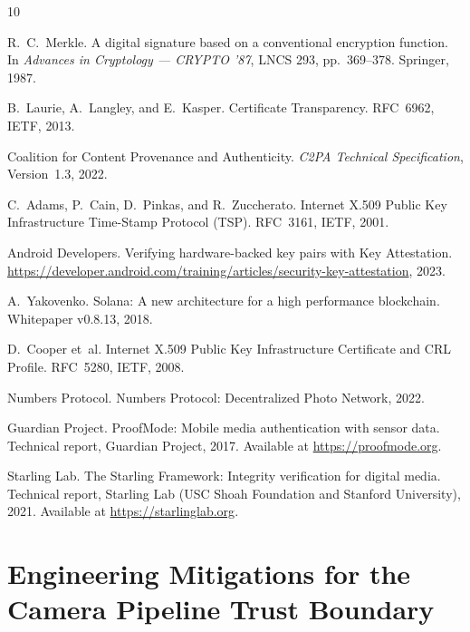\documentclass[11pt,a4paper]{article}
\begin{document}
\begin{thebibliography}{10}

R.~C.~Merkle.
\newblock A digital signature based on a conventional encryption function.
\newblock In \emph{Advances in Cryptology --- CRYPTO '87}, LNCS 293,
  pp.~369--378.
\newblock Springer, 1987.

B.~Laurie, A.~Langley, and E.~Kasper.
\newblock Certificate Transparency.
\newblock RFC~6962, IETF, 2013.

Coalition for Content Provenance and Authenticity.
\newblock \emph{C2PA Technical Specification}, Version~1.3, 2022.

C.~Adams, P.~Cain, D.~Pinkas, and R.~Zuccherato.
\newblock Internet X.509 Public Key Infrastructure Time-Stamp Protocol (TSP).
\newblock RFC~3161, IETF, 2001.

Android Developers.
\newblock Verifying hardware-backed key pairs with Key Attestation.
\newblock \url{https://developer.android.com/training/articles/security-key-attestation},
  2023.

A.~Yakovenko.
\newblock Solana: A new architecture for a high performance blockchain.
\newblock Whitepaper v0.8.13, 2018.

D.~Cooper et~al.
\newblock Internet X.509 Public Key Infrastructure Certificate and CRL
  Profile.
\newblock RFC~5280, IETF, 2008.

Numbers Protocol.
\newblock Numbers Protocol: Decentralized Photo Network, 2022.

Guardian Project.
\newblock ProofMode: Mobile media authentication with sensor data.
\newblock Technical report, Guardian Project, 2017.
\newblock Available at \url{https://proofmode.org}.

Starling Lab.
\newblock The Starling Framework: Integrity verification for digital media.
\newblock Technical report, Starling Lab (USC Shoah Foundation and Stanford
  University), 2021.
\newblock Available at \url{https://starlinglab.org}.

\end{thebibliography}

\appendix

\section{Engineering Mitigations for the Camera Pipeline Trust Boundary}
\label{app:mitigations}
\end{document}
